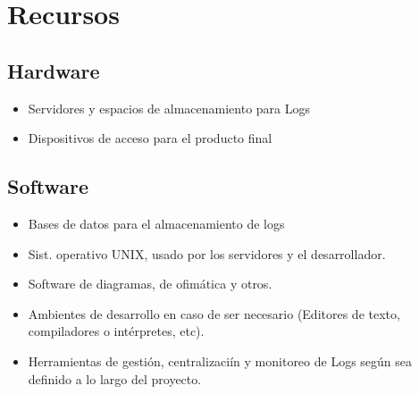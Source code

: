 \section{Recursos}
  \subsection{Hardware}
    \begin{itemize}
      \item Servidores y espacios de almacenamiento para Logs
      \item Dispositivos de acceso para el producto final
    \end{itemize}
  \subsection{Software}
    \begin{itemize}
      \item Bases de datos para el almacenamiento de logs
      \item Sist. operativo UNIX, usado por los servidores y el desarrollador.
      \item Software de diagramas, de ofimática y otros.
      \item Ambientes de desarrollo en caso de ser necesario (Editores de texto, compiladores o intérpretes, etc).
      \item Herramientas de gestión, centralizaciín y monitoreo de Logs según sea definido a lo largo del proyecto.
    \end{itemize}
